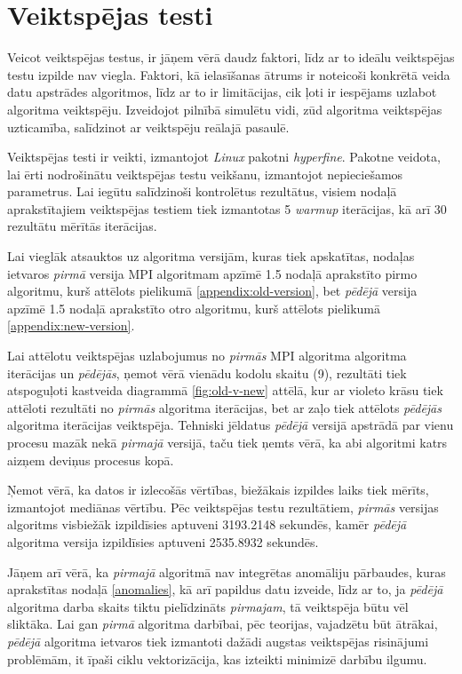 \section{Veiktspējas testi}

Veicot veiktspējas testus, ir jāņem vērā daudz faktori, līdz ar to ideālu veiktspējas testu izpilde nav viegla. Faktori, kā ielasīšanas ātrums ir noteicoši konkrētā veida datu apstrādes algoritmos, līdz ar to ir limitācijas, cik ļoti ir iespējams uzlabot algoritma veiktspēju. Izveidojot pilnībā simulētu vidi, zūd algoritma veiktspējas uzticamība, salīdzinot ar veiktspēju reālajā pasaulē.

Veiktspējas testi ir veikti, izmantojot \textit{Linux} pakotni \textit{hyperfine}\cite{hyperfine}. Pakotne veidota, lai ērti nodrošinātu veiktspējas testu veikšanu, izmantojot nepieciešamos parametrus. Lai iegūtu salīdzinoši kontrolētus rezultātus, visiem nodaļā aprakstītajiem veiktspējas testiem tiek izmantotas 5 \textit{warmup} iterācijas, kā arī 30 rezultātu mērītās iterācijas.

Lai vieglāk atsauktos uz algoritma versijām, kuras tiek apskatītas, nodaļas ietvaros \textit{pirmā} versija MPI algoritmam apzīmē 1.5 nodaļā aprakstīto pirmo algoritmu, kurš attēlots pielikumā \ref{appendix:old-version}, bet \textit{pēdējā} versija apzīmē 1.5 nodaļā aprakstīto otro algoritmu, kurš attēlots pielikumā \ref{appendix:new-version}.

Lai attēlotu veiktspējas uzlabojumus no \textit{pirmās} MPI algoritma algoritma iterācijas un \textit{pēdējās}, ņemot vērā vienādu kodolu skaitu (9), rezultāti tiek atspoguļoti kastveida diagrammā \ref{fig:old-v-new} attēlā, kur ar violeto krāsu tiek attēloti rezultāti no \textit{pirmās} algoritma iterācijas, bet ar zaļo tiek attēlots \textit{pēdējās} algoritma iterācijas veiktspēja. Tehniski jēldatus \textit{pēdējā} versijā apstrādā par vienu procesu mazāk nekā \textit{pirmajā} versijā, taču tiek ņemts vērā, ka abi algoritmi katrs aizņem deviņus procesus kopā. 



Ņemot vērā, ka datos ir izlecošās vērtības, biežākais izpildes laiks tiek mērīts, izmantojot mediānas vērtību. Pēc veiktspējas testu rezultātiem, \textit{pirmās} versijas algoritms visbiežāk izpildīsies aptuveni 3193.2148 sekundēs, kamēr \textit{pēdējā} algoritma versija izpildīsies aptuveni 2535.8932 sekundēs. 


Jāņem arī vērā, ka \textit{pirmajā} algoritmā nav integrētas anomāliju pārbaudes, kuras aprakstītas nodaļā \ref{anomalies}, kā arī papildus datu izveide, līdz ar to, ja \textit{pēdējā} algoritma darba skaits tiktu pielīdzināts \textit{pirmajam}, tā veiktspēja būtu vēl sliktāka. Lai gan \textit{pirmā} algoritma darbībai, pēc teorijas, vajadzētu būt ātrākai, \textit{pēdējā} algoritma ietvaros tiek izmantoti dažādi augstas veiktspējas risinājumi problēmām, it īpaši ciklu vektorizācija, kas izteikti minimizē darbību ilgumu.

